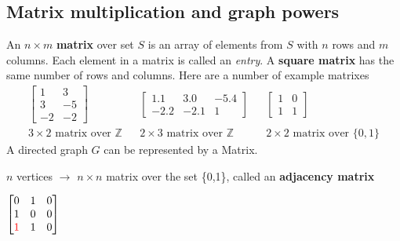\subsection{Matrix multiplication and graph powers}
An $n \times m$ \textbf{matrix} over set $S$ is an array of elements from $S$ with $n$ rows and $m$ columns.
Each element in a matrix is called an \textit{entry}.
A \textbf{square matrix} has the same number of rows and columns.
Here are a number of example matrixes
\begin{align*}
  \begin{bmatrix}
    1  & 3  \\
    3  & -5 \\
    -2 & -2
  \end{bmatrix}
                                             &  &
  \begin{bmatrix}
    1.1  & 3.0  & -5.4 \\
    -2.2 & -2.1 & 1
  \end{bmatrix}
                                             &  &
  \begin{bmatrix}
    1 & 0 \\
    1 & 1
  \end{bmatrix}                                                                                                                          \\
  3 \times 2 \text{ matrix over } \mathbb{Z} &  & 2 \times 3 \text{ matrix over } \mathbb{Z} &  & 2 \times 2 \text{ matrix over } \{0,1\}
\end{align*}
A directed graph $G$ can be represented by a Matrix.
\begin{center}
  $n$ vertices $\rightarrow$ $n \times n$ matrix over the set \{0,1\}, called an \textbf{adjacency matrix}
\end{center}
\begin{center}
  $
    \begin{bmatrix}
      0                       & 1 & 0 \\
      1                       & 0 & 0 \\
      \text{\textcolor{red}1} & 1 & 0
    \end{bmatrix}
  $
\end{center}
